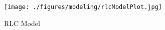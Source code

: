 \begin{figure}
\texttt{[image: ./figures/modeling/rlcModelPlot.jpg]}
\centering
\caption{RLC Model}
\label{fig:rlcModel}
\end{figure}
